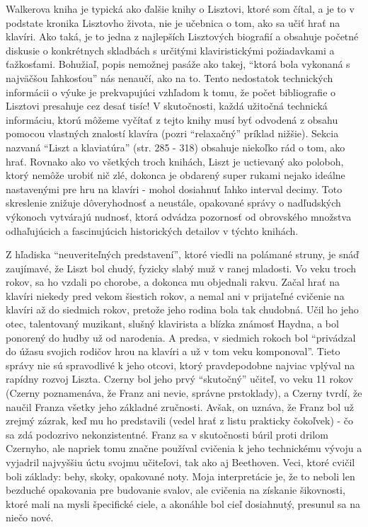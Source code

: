 Walkerova kniha je typická ako ďalšie knihy o Lisztovi, ktoré som čítal, a je to v podstate kronika Lisztovho života, nie je učebnica o tom, ako sa učiť hrať na klavíri. Ako taká, je to jedna z najlepších Lisztových biografií a obsahuje početné diskusie o konkrétnych skladbách s určitými klaviristickými požiadavkami a ťažkosťami. Bohužiaľ, popis nemožnej pasáže ako takej, “ktorá bola vykonaná s najväčšou ľahkosťou” nás nenaučí, ako na to. Tento nedostatok technických informácii o výuke je prekvapujúci vzhľadom k tomu, že počet bibliografie o Lisztovi presahuje cez desať tisíc! V skutočnosti, každá užitočná technická informáciu, ktorú môžeme vyčítať z tejto knihy musí byť odvodená z obsahu pomocou vlastných znalostí klavíra (pozri “relaxačný” príklad nižšie). Sekcia nazvaná “Liszt a klaviatúra” (str. 285 - 318) obsahuje niekoľko rád o tom, ako hrať. Rovnako ako vo všetkých troch knihách, Liszt je uctievaný ako poloboh, ktorý nemôže urobiť nič zlé, dokonca je obdarený super rukami nejako ideálne nastavenými pre hru na klavíri - mohol dosiahnuť ľahko interval decimy. Toto skreslenie znižuje dôveryhodnosť a neustále, opakované správy o nadľudských výkonoch vytvárajú nudnosť, ktorá odvádza pozornosť od obrovského množstva odhaľujúcich a fascinujúcich historických detailov v týchto knihách. 

Z hľadiska “neuveriteľných predstavení”, ktoré viedli na polámané struny, je snáď zaujímavé, že Liszt bol chudý, fyzicky slabý muž v ranej mladosti. Vo veku troch rokov, sa ho vzdali po chorobe, a dokonca mu objednali rakvu. Začal hrať na klavíri niekedy pred vekom šiestich rokov, a nemal ani v prijateľné cvičenie na klavíri až do siedmich rokov, pretože jeho rodina bola tak chudobná. Učil ho jeho otec, talentovaný muzikant, slušný klavirista a blízka známosť Haydna, a bol ponorený do hudby už od narodenia. A predsa, v siedmich rokoch bol “privádzal do úžasu svojich rodičov hrou na klavíri a už v tom veku komponoval”. Tieto správy nie sú spravodlivé k jeho otcovi, ktorý pravdepodobne najviac vplýval na rapídny rozvoj Liszta. Czerny bol jeho prvý “skutočný” učiteľ, vo veku 11 rokov (Czerny poznamenáva, že Franz ani nevie, správne prstoklady), a Czerny tvrdí, že naučil Franza všetky jeho základné zručnosti. Avšak, on uznáva, že Franz bol už zrejmý zázrak, keď mu ho predstavili (vedel hrať z listu prakticky čokoľvek) - čo sa zdá podozrivo nekonzistentné. Franz sa v skutočnosti búril proti drilom Czernyho, ale napriek tomu značne používal cvičenia k jeho technickému vývoju a vyjadril najvyššiu úctu svojmu učiteľovi, tak ako aj Beethoven. Veci, ktoré cvičil boli základy: behy, skoky, opakované noty. Moja interpretácie je, že to neboli len bezduché opakovania pre budovanie svalov, ale cvičenia na získanie šikovnosti, ktoré mali na mysli špecifické ciele, a akonáhle bol cieľ dosiahnutý, presunul sa na niečo nové. 


